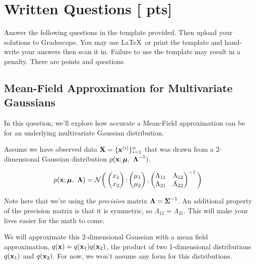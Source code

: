 \documentclass[11pt,addpoints,answers]{exam}
\numberwithin{equation}{section} %
\numberwithin{figure}{section} %
\numberwithin{table}{section} %
\newcommand{\pts}[1]{\textbf{[#1 pts]}}
\begin{document}
\clearpage

\section{Written Questions \pts{\numpoints{}}}
\label{sec:warmup}
Answer the following questions in the template provided.  Then upload your solutions to Gradescope. You may use \LaTeX\ or print the template and hand-write your answers then scan it in. Failure to use the template may result in a penalty. There are \numpoints{} points and \numquestions{} questions.

\subsection{Mean-Field Approximation for Multivariate Gaussians}

In this question, we'll explore how accurate a Mean-Field approximation can be for an underlying multivariate Gaussian distribution. 

Assume we have observed data $\mathbf{X} = \{\mathbf{x}^{(i)}\}_{i=1}^n$ that was drawn from a 2-dimensional Gaussian distribution $p(\xv; \muv, \ \Lambdav^{-1})$. 

\begin{equation}
    p(\mathbf{x}; \boldsymbol \mu, \ \boldsymbol \Lambda) = \mathcal{N}\bigg ( 
    \begin{pmatrix}
    x_1 \\
    x_2 \\
    \end{pmatrix} ;
    \begin{pmatrix}
    \mu_1 \\
    \mu_2
    \end{pmatrix}, 
    \begin{pmatrix}
    \Lambda_{11} & \Lambda_{12} \\
    \Lambda_{21} & \Lambda_{22} \\
    \end{pmatrix}^{-1}
    \bigg )
\end{equation}

Note here that we're using the \textit{precision} matrix $\boldsymbol \Lambda = \boldsymbol \Sigma^{-1}$. An additional property of the precision matrix is that it is symmetric, so $\Lambda_{12} = \Lambda_{21}$. This will make your lives easier for the math to come. 

We will approximate this 2-dimensional Gaussian with a mean field approximation, $q(\mathbf{x}) = q(\mathbf{x}_1)q(\mathbf{x}_2)$, the product of two 1-dimensional distributions $q(\mathbf{x}_1)$ and $q(\mathbf{x}_2)$. For now, we won't assume any form for this distributions. 
\end{document}
